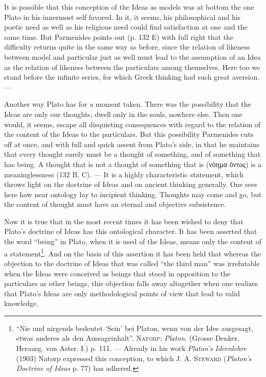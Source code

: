 \documentclass[12pt,a4paper,openany]{book}
\newcommand{\opage}[1]{\marginnote{\footnotesize\textit{[#1]}}}
\begin{document}
It is possible that this conception of the Ideas as models
was at bottom the one Plato in his innermost self favored.
In it, it seems, his philosophical and his poetic
\setcounter{footnote}{0}%
\opage{20}need as well as his religious need could find satisfaction
at one and the same time. But Parmenides points out (p. 132 E) with
full right that the difficulty returns
quite in the same way as before, since the relation of likeness
between model and particular just as well must lead
to the assumption of an Idea as the relation of likeness between the particulars
among themselves. Here too we stand before the infinite
series, for which Greek thinking had such great
aversion. ---

Another way Plato has for a moment taken. There was
the possibility that the Ideas are only our thoughts, dwell only
in the souls, nowhere else. Then one would, it seems, escape
all disquieting consequences with regard to the relation of the
content of the Ideas to the particulars. But this possibility Parmenides
cuts off at once, and with full and quick assent from
Plato’s side, in that he maintains that every thought surely
must be a thought of something, and of something that has
being. A thought that is not a thought of something that is
(νόημα ὄντος) is a meaninglessness (132 B, C). --- It is a
highly characteristic statement, which throws light on
the doctrine of Ideas and on ancient thinking generally. One sees here
how near ontology lay to incipient thinking.
Thoughts may come and go, but the content of thought must
have an eternal and objective subsistence.

Now it is true that in the most recent times it has been wished to deny
that Plato’s doctrine of Ideas has this ontological character. It
has been asserted that the word ``being'' in Plato, when it is used
of the Ideas, means only the content of a statement\footnote[1]{``Nie und nirgends bedeutet `Sein' bei Platon, wenn von der Idee ausgesagt, etwas anderes als den Aussageinhalt''. \textsc{Natorp}: \textit{Platon.} (Grosse Denker. Herausg. von Aster. I.) p. 111. --- Already in his work \textit{Platon’s Ideenlehre} (1903) Natorp expressed this conception, to which J. A. \textsc{Steward} (\textit{Platon’s Doctrine of Ideas} p. 77) has adhered.}. And
\setcounter{footnote}{0}%
\opage{21}on the basis of this assertion it has been held that whereas
the objection to the doctrine of Ideas that was called ``the third
man'' was irrefutable when the Ideas were conceived as
beings that stood in opposition to the particulars as
other beings, this objection falls away altogether
when one realizes that Plato’s Ideas are only methodological
points of view that lead to valid knowledge.
\end{document}
